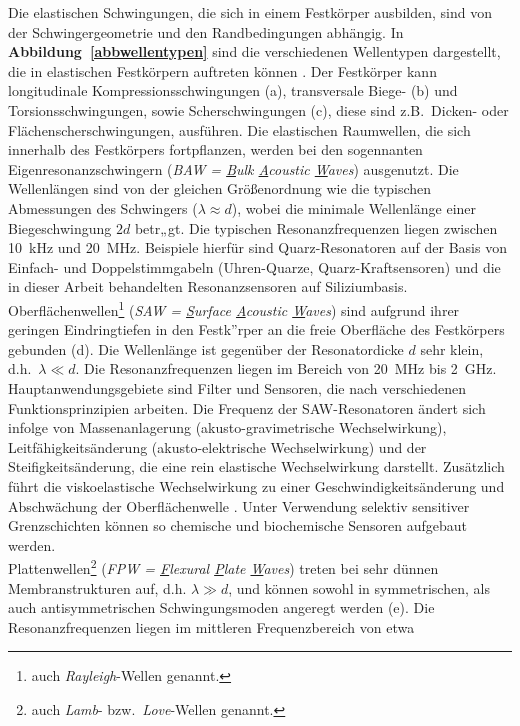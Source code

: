 Die elastischen Schwingungen, die sich in einem Festkörper ausbilden,
sind von der Schwingergeometrie und den Randbedingungen abhängig.  In
{\bf Abbildung~\ref{abbwellentypen}} sind die verschiedenen
Wellentypen dargestellt, die in
elastischen Festkörpern auftreten können \cite{Whi70}.  Der Festkörper kann
longitudinale Kompressionsschwingungen (a), transversale Biege- (b) und
Torsionsschwingungen, sowie Scherschwingungen (c), diese sind z.B.\
Dicken- oder Flächenscherschwingungen, ausführen. Die elastischen Raumwellen,
die sich innerhalb des Festkörpers fortpflanzen, werden bei den sogennanten
Eigenresonanzschwingern ({\sl BAW = \underline{B}ulk
\underline{A}coustic \underline{W}aves}) ausgenutzt.  Die Wellenlängen
sind von der gleichen Größenordnung wie die typischen Abmessungen des
Schwingers ($\lambda \approx d$), wobei die minimale Wellenlänge
einer Biegeschwingung $2d$ betr„gt.  Die typischen Resonanzfrequenzen
liegen zwischen 10~kHz und 20~MHz. Beispiele hierfür sind
Quarz-Resonatoren auf der Basis von Einfach- und Doppelstimmgabeln
(Uhren-Quarze, Quarz-Kraftsensoren) und die in dieser Arbeit behandelten
Resonanzsensoren auf Siliziumbasis.\\
Oberflächenwellen\footnote{auch {\sl Rayleigh}-Wellen genannt.}
({\sl SAW = \underline{S}urface \underline{A}coustic \underline{W}aves})
sind aufgrund ihrer geringen Eindringtiefen in den Festk”rper an die freie
Oberfläche des Festkörpers gebunden (d). Die Wellenlänge ist gegenüber der
Resonatordicke $d$ sehr
klein, d.h.\ $\lambda \ll d$.  Die Resonanzfrequenzen liegen im
Bereich von 20~MHz bis 2~GHz. Hauptanwendungsgebiete sind Filter und
Sensoren, die nach verschiedenen Funktionsprinzipien arbeiten. Die Frequenz
der SAW-Resonatoren ändert sich infolge von
Massenanlagerung (akusto-gravimetrische Wechselwirkung),
Leitfähigkeitsänderung (akusto-elektrische Wechselwirkung) und der
Steifigkeitsänderung, die eine rein elastische Wechselwirkung darstellt.
Zusätzlich führt die viskoelastische Wechselwirkung zu einer
Geschwindigkeitsänderung und Abschwächung der Oberflächenwelle \cite{Ric91}.
Unter Verwendung selektiv sensitiver Grenzschichten können so chemische
und biochemische Sensoren aufgebaut werden. \\
Plattenwellen\footnote{auch {\sl Lamb}- bzw.\ {\sl Love}-Wellen genannt.}
({\sl FPW = \underline{F}lexural \underline{P}late
\underline{W}aves}) treten bei sehr dünnen Membranstrukturen auf, d.h.
$\lambda \gg d$, und können sowohl in symmetrischen, als auch
antisymmetrischen Schwingungsmoden angeregt werden (e). Die
Resonanzfrequenzen liegen im mittleren Frequenzbereich von etwa
